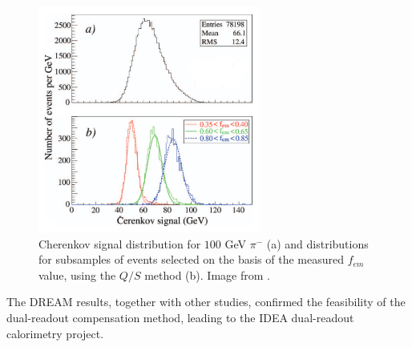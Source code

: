 \begin{figure}
	\centering
	\includegraphics[width=0.65\textwidth]{IMG/Cap2/fem_subsamp.png}
	\caption{Cherenkov signal distribution for $100$ GeV $\pi^-$ (a) and distributions for subsamples of events selected on the basis of the measured $f_{em}$ value, using the $Q/S$ method (b). Image from \cite{Wigmans_art_of_cal}.}
	\label{fig:fem_subsamp}
\end{figure}

The DREAM results, together with other studies, confirmed the feasibility of the dual-readout compensation method, leading to the IDEA dual-readout calorimetry project.